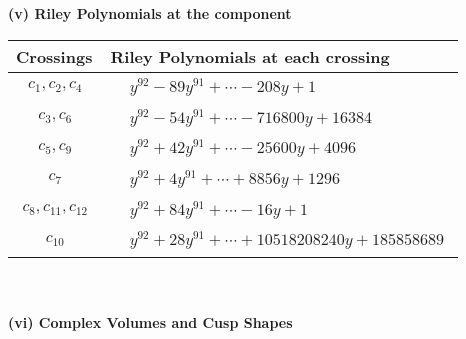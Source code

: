 \documentclass[1p]{elsarticle_modified}
\theoremstyle{definition}
\begin{document}
\newpage\renewcommand{\arraystretch}{1}
\flushleft \textbf{(v) Riley Polynomials at the component}\newline \\
\begin{tabular}{m{50pt}|m{274pt}}
Crossings & \hspace{64pt}Riley Polynomials at each crossing \\
\hline $$\begin{aligned}c_{1},c_{2},c_{4}\end{aligned}$$&$\begin{aligned}
&y^{92}-89 y^{91}+\cdots-208 y+1
\end{aligned}$\\
\hline $$\begin{aligned}c_{3},c_{6}\end{aligned}$$&$\begin{aligned}
&y^{92}-54 y^{91}+\cdots-716800 y+16384
\end{aligned}$\\
\hline $$\begin{aligned}c_{5},c_{9}\end{aligned}$$&$\begin{aligned}
&y^{92}+42 y^{91}+\cdots-25600 y+4096
\end{aligned}$\\
\hline $$\begin{aligned}c_{7}\end{aligned}$$&$\begin{aligned}
&y^{92}+4 y^{91}+\cdots+8856 y+1296
\end{aligned}$\\
\hline $$\begin{aligned}c_{8},c_{11},c_{12}\end{aligned}$$&$\begin{aligned}
&y^{92}+84 y^{91}+\cdots-16 y+1
\end{aligned}$\\
\hline $$\begin{aligned}c_{10}\end{aligned}$$&$\begin{aligned}
&y^{92}+28 y^{91}+\cdots+10518208240 y+185858689
\end{aligned}$\\
\hline
\end{tabular}\\~\\
\newpage\flushleft \textbf{(vi) Complex Volumes and Cusp Shapes}
\end{document}
